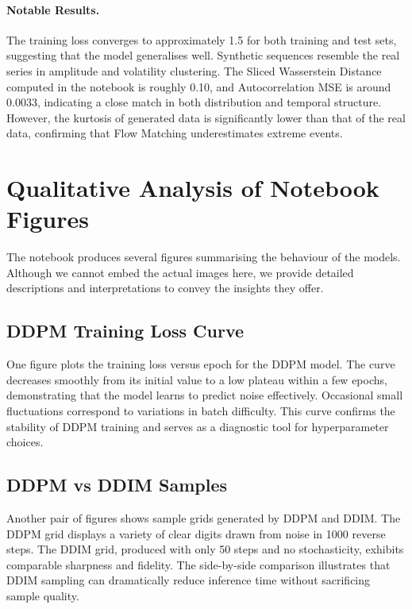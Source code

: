 \paragraph{Notable Results.}  The training loss converges to
approximately 1.5 for both training and test sets, suggesting that
the model generalises well.  Synthetic sequences resemble the real
series in amplitude and volatility clustering.  The Sliced
Wasserstein Distance computed in the notebook is roughly 0.10, and
Autocorrelation MSE is around 0.0033, indicating a close match in
both distribution and temporal structure.  However, the kurtosis of
generated data is significantly lower than that of the real data,
confirming that Flow Matching underestimates extreme events.

\section{Qualitative Analysis of Notebook Figures}

The notebook produces several figures summarising the behaviour of
the models.  Although we cannot embed the actual images here,
we provide detailed descriptions and interpretations to convey the
insights they offer.

\subsection{DDPM Training Loss Curve}

One figure plots the training loss versus epoch for the DDPM model.
The curve decreases smoothly from its initial value to a low plateau
within a few epochs, demonstrating that the model learns to predict
noise effectively.  Occasional small fluctuations correspond to
variations in batch difficulty.  This curve confirms the stability
of DDPM training and serves as a diagnostic tool for hyperparameter
choices.

\subsection{DDPM vs DDIM Samples}

Another pair of figures shows sample grids generated by DDPM and
DDIM.  The DDPM grid displays a variety of clear digits drawn from
noise in 1000 reverse steps.  The DDIM grid, produced with only 50
steps and no stochasticity, exhibits comparable sharpness and
fidelity.  The side-by-side comparison illustrates that DDIM
sampling can dramatically reduce inference time without sacrificing
sample quality.

